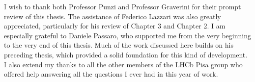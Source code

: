 I wish to thank both Professor Punzi and Professor Graverini for their prompt review of this thesis. The assistance of Federico Lazzari was also greatly appreciated, particularly for his review of Chapter 3 and Chapter 2. I am especially grateful to Daniele Passaro, who supported me from the very beginning to the very end of this thesis. Much of the work discussed here builds on his preceding thesis, which provided a solid foundation for this kind of development. I also extend my thanks to all the other members of the LHCb Pisa group who offered help answering all the questions I ever had in this year of work. 